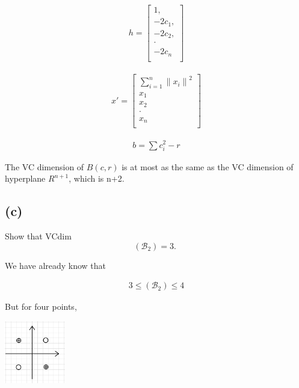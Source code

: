 \documentclass{article}
\begin{document}
\begin{align}
    h =
    \begin{bmatrix}
        1,       \\
        -2c_{1}, \\
        -2c_{2}, \\
        \cdot    \\
        -2c_{n}  \\
    \end{bmatrix}
\end{align}


\begin{align}
    x' =
    \begin{bmatrix}
        \sum_{i=1}^{n} {\|x_{i}\|}^2 \\
        x_{1}                        \\
        x_{2}                        \\
        \cdot                        \\
        x_{n}                        \\
    \end{bmatrix}
\end{align}


\begin{align}
    b = \sum c_{i}^{2} - r
\end{align}

The VC dimension of $B(c, r)$ is at most as the same as the VC dimension of hyperplane $R^{n+1}$, which is n+2.


\subsection*{(c)}
Show that VCdim
\begin{equation}
    \left(\mathcal{B}_{2}\right)=3 \text {. }
\end{equation}

We have already know that

\begin{align}
    3 \leq \left(\mathcal{B}_{2}\right) \leq 4
\end{align}

But for four points,

\begin{center}
    \includegraphics[width=100px]{./images/1_1.png}
\end{center}
\end{document}
